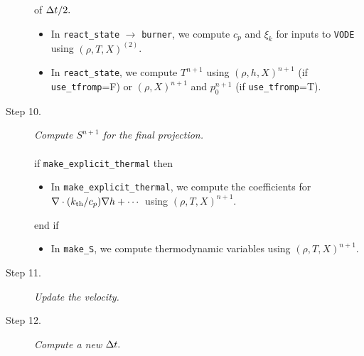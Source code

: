 \begin{description}
{of $\Delta t/2.$}
\begin{itemize}
\item In {\tt react\_state} $\rightarrow$ {\tt burner}, we compute $c_p$ and $\xi_k$ 
for inputs to {\tt VODE} using $(\rho,T,X)^{(2)}$.
\item In {\tt react\_state}, we compute $T^{n+1}$ using $(\rho,h,X)^{n+1}$ 
(if {\tt use\_tfromp}=F) or $(\rho,X)^{n+1}$ and $p_0^{n+1}$ (if {\tt use\_tfromp}=T).
\end{itemize}
\item[Step 10.] {\em Compute $S^{n+1}$ for the final projection.}\\ \\
if {\tt make\_explicit\_thermal} then
\begin{itemize}
\item In {\tt make\_explicit\_thermal}, we compute the coefficients for 
$\nabla\cdot(k_{\rm th}/c_p)\nabla h + \cdots$ using $(\rho,T,X)^{n+1}$.
\end{itemize}
end if
\begin{itemize}
\item In {\tt make\_S}, we compute thermodynamic variables using $(\rho,T,X)^{n+1}$.
\end{itemize}
\item[Step 11.] {\em Update the velocity.}
\item[Step 12.] {\em Compute a new $\Delta t.$}
\end{description}
